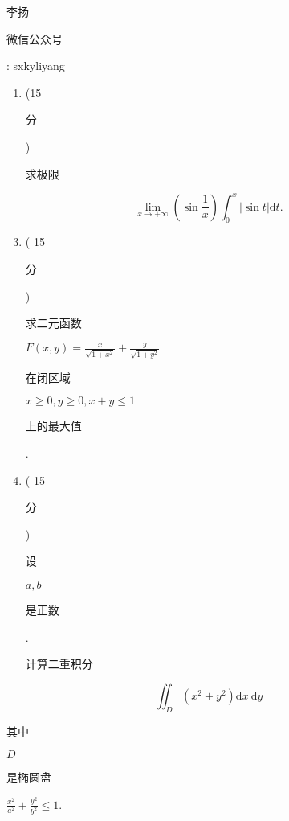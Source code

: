 \documentclass[10pt]{article}
\begin{document}
\begin{CJK}{UTF8}{mj}李扬\end{CJK}

\begin{CJK}{UTF8}{mj}微信公众号\end{CJK}: sxkyliyang

\begin{enumerate}
  \item (15 \begin{CJK}{UTF8}{mj}分\end{CJK}) \begin{CJK}{UTF8}{mj}求极限\end{CJK}
\end{enumerate}
$$
\lim _{x \rightarrow+\infty}\left(\sin \frac{1}{x}\right) \int_{0}^{x}|\sin t| \mathrm{d} t .
$$

\begin{enumerate}
  \setcounter{enumi}{2}
  \item ( 15 \begin{CJK}{UTF8}{mj}分\end{CJK}) \begin{CJK}{UTF8}{mj}求二元函数\end{CJK} $F(x, y)=\frac{x}{\sqrt{1+x^{2}}}+\frac{y}{\sqrt{1+y^{2}}}$ \begin{CJK}{UTF8}{mj}在闭区域\end{CJK} $x \geqslant 0, y \geqslant 0, x+y \leqslant 1$ \begin{CJK}{UTF8}{mj}上的最大值\end{CJK}.

  \item ( 15 \begin{CJK}{UTF8}{mj}分\end{CJK}) \begin{CJK}{UTF8}{mj}设\end{CJK} $a, b$ \begin{CJK}{UTF8}{mj}是正数\end{CJK}. \begin{CJK}{UTF8}{mj}计算二重积分\end{CJK}

\end{enumerate}
$$
\iint_{D}\left(x^{2}+y^{2}\right) \mathrm{d} x \mathrm{~d} y
$$
\begin{CJK}{UTF8}{mj}其中\end{CJK} $D$ \begin{CJK}{UTF8}{mj}是椭圆盘\end{CJK} $\frac{x^{2}}{a^{2}}+\frac{y^{2}}{b^{2}} \leqslant 1$.
\end{document}
